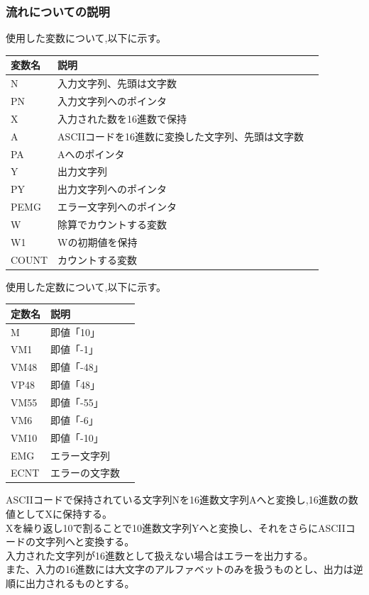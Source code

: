\documentclass[dvipdfmx,12pt]{jreport}
\begin{document}
\subsubsection*{流れについての説明}
使用した変数について,以下に示す。
\begin{table}[h]
  \begin{tabular}{|l|l|l|} \hline
    変数名 & 説明 \\ \hline
    N & 入力文字列、先頭は文字数 \\ \hline
    PN & 入力文字列へのポインタ \\ \hline
    X & 入力された数を16進数で保持 \\ \hline
    A &  ASCIIコードを16進数に変換した文字列、先頭は文字数 \\ \hline
    PA & Aへのポインタ \\ \hline
    Y & 出力文字列 \\ \hline
    PY & 出力文字列へのポインタ \\ \hline    
    PEMG & エラー文字列へのポインタ \\ \hline
    W & 除算でカウントする変数 \\ \hline
    W1 & Wの初期値を保持 \\ \hline
    COUNT & カウントする変数 \\ \hline
  \end{tabular}
\end{table}
使用した定数について,以下に示す。
\begin{table}[h]
  \begin{tabular}{|l|l|l|} \hline
    定数名 & 説明 \\ \hline
    M & 即値「10」 \\ \hline
    VM1 & 即値「-1」 \\ \hline
    VM48 & 即値「-48」 \\ \hline
    VP48 & 即値「48」 \\ \hline
    VM55 & 即値「-55」 \\ \hline
    VM6 & 即値「-6」 \\ \hline
    VM10 & 即値「-10」 \\ \hline
    EMG & エラー文字列 \\ \hline
    ECNT & エラーの文字数 \\ \hline
  \end{tabular}
\end{table}

ASCIIコードで保持されている文字列Nを16進数文字列Aへと変換し,16進数の数値としてXに保持する。 \\
Xを繰り返し10で割ることで10進数文字列Yへと変換し、それをさらにASCIIコードの文字列へと変換する。 \\
入力された文字列が16進数として扱えない場合はエラーを出力する。 \\
また、入力の16進数には大文字のアルファベットのみを扱うものとし、出力は逆順に出力されるものとする。 \\
\end{document}
